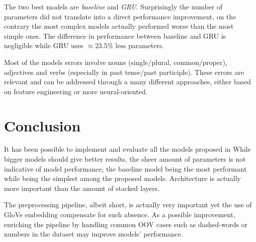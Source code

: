 \documentclass[11pt]{article}
\begin{document}
The two best models are \textit{baseline} and \textit{GRU}. Surprisingly the number of parameters did not translate into a direct performance improvement, on the contrary the most complex models actually performed worse than the most simple ones. The difference in performance between baseline and GRU is negligible while GRU uses $\approx 23.5\%$ less parameters.

Most of the models errors involve nouns (single/plural, common/proper), adjectives and verbs (especially in past tense/past participle). These errors are relevant and can be addressed through a many different approaches, either based on feature engineering or more neural-oriented.

\section{Conclusion}
\label{sec:conclusion}


It has been possible to implement and evaluate all the models proposed in While bigger models should give better results, the sheer amount of parameters is not indicative of model performance, the baseline model being the most performant while being the simplest among the proposed models. Architecture is actually more important than the amount of stacked layers.

The preprocessing pipeline, albeit short, is actually very important yet the use of GloVe embedding compensate for such absence. As a possible improvement, enriching the pipeline by handling common OOV cases such as dashed-words or numbers in the dataset may improve models' performance.






\end{document}
